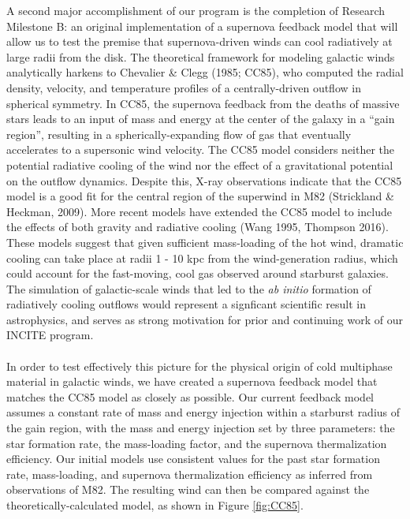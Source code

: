 \documentclass[11pt,letterpaper,english]{article}
\begin{document}
A second major accomplishment of our program is the completion of Research Milestone B: an original
implementation of a supernova feedback model that will allow us to test the premise that supernova-driven winds can cool radiatively at large radii from the disk. The theoretical framework for modeling
galactic winds analytically harkens to Chevalier \& Clegg (1985; CC85), who computed the radial density, velocity,
and temperature profiles of a centrally-driven outflow in spherical symmetry. In CC85, the supernova
feedback from the deaths of massive stars leads to an input of mass and energy at the center of the
galaxy in a ``gain region'', resulting in a spherically-expanding flow of gas that
eventually accelerates to a supersonic wind velocity. The CC85 model considers neither 
the potential 
radiative cooling of the wind nor the effect of a gravitational potential on the outflow dynamics.
Despite this, X-ray observations indicate that the CC85 model is a good fit for the central region of the superwind in M82 (Strickland \& Heckman, 2009). More recent models have extended the CC85 model to include the effects of both gravity and radiative cooling (Wang 1995, Thompson 2016). These models suggest that given sufficient mass-loading of the hot wind, dramatic cooling can take place at radii 1 - 10 kpc from the wind-generation radius, which could account for the fast-moving, cool gas observed around starburst galaxies. The simulation of galactic-scale winds that led to the \textit{ab initio} formation of radiatively
cooling outflows would represent a signficant scientific result in astrophysics, and serves as strong
motivation for prior and continuing work of our INCITE program.
~\\~\\
In order to test effectively this picture for the physical origin of cold multiphase material in galactic
winds, we have created a supernova feedback model that matches the CC85 model as closely as possible. 
Our current feedback model assumes a constant rate of mass and energy injection within a starburst radius
of the gain region, with the mass and energy injection set by three parameters: the star formation rate, the mass-loading factor, and the supernova thermalization efficiency. Our initial models use consistent
values for the past star formation rate, mass-loading, and supernova thermalization efficiency as inferred from observations of M82. The resulting wind can then be compared against the theoretically-calculated model, as shown in Figure \ref{fig:CC85}. 
~\\~\\
\end{document}
